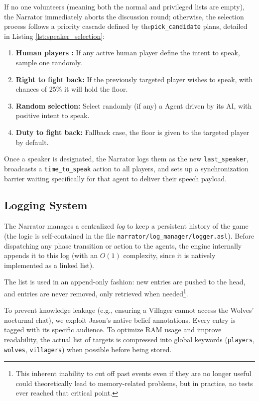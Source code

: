 If no one volunteers (meaning both the normal and privileged lists are empty), the Narrator immediately aborts the discussion round; otherwise, the selection process follows a priority cascade defined by the\texttt{pick\_candidate} plans, detailed in Listing \ref{lst:speaker_selection}:

\begin{enumerate}
    \item \textbf{Human players :} If any active human player define the intent to speak, sample one randomly. 
    \item \textbf{Right to fight back:} If the previously targeted player wishes to speak, with chances of 25\% it will hold the floor.
    \item \textbf{Random selection:} Select randomly (if any) a Agent driven by its AI, with positive intent to speak.
    \item \textbf{Duty to fight back:} Fallback case, the floor is given to the targeted player by default.
\end{enumerate}

Once a speaker is designated, the Narrator logs them as the new \texttt{last\_speaker}, broadcasts a \texttt{time\_to\_speak} action to all players, and sets up a synchronization barrier waiting specifically for that agent to deliver their speech payload.

\subsection{Logging System}
\label{subsec:logging}

The Narrator manages a centralized \emph{log} to keep a persistent history of the game (the logic is self-contained in the file \texttt{narrator/log\_manager/logger.asl}). Before dispatching any phase transition or action to the agents, the engine internally appends it to this log (with an $O(1)$ complexity, since it is natively implemented as a linked list). 

The list is used in an append-only fashion: new entries are pushed to the head, and entries are never removed, only retrieved when needed\footnote{This inherent inability to cut off past events even if they are no longer useful could theoretically lead to memory-related problems, but in practice, no tests ever reached that critical point.}.

To prevent knowledge leakage (e.g., ensuring a Villager cannot access the Wolves' nocturnal chat), we exploit Jason's native belief annotations. Every entry is tagged with its specific audience. 
To optimize RAM usage and improve readability, the actual list of targets is compressed into global keywords (\texttt{players}, \texttt{wolves}, \texttt{villagers}) when possible before being stored. 

